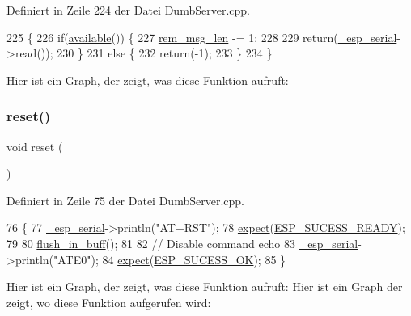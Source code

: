 Definiert in Zeile 224 der Datei Dumb\+Server.\+cpp.


\begin{DoxyCode}
225 \{
226   \textcolor{keywordflow}{if}(\hyperlink{classEspServer_a4549a76725f2e4c013e4d57018366109}{available}()) \{
227     \hyperlink{classEspServer_a34a62d83c82a13f441af983f9b212e25}{rem\_msg\_len} -= 1;
228 
229     \textcolor{keywordflow}{return}(\hyperlink{classEspServer_a552aab874ad99b696f4c997d6f5a4746}{\_esp\_serial}->read());
230   \}
231   \textcolor{keywordflow}{else} \{
232     \textcolor{keywordflow}{return}(-1);
233   \}
234 \}
\end{DoxyCode}
Hier ist ein Graph, der zeigt, was diese Funktion aufruft\+:
\mbox{\label{classEspServer_ad20897c5c8bd47f5d4005989bead0e55}} 
\subsubsection{\texorpdfstring{reset()}{reset()}}
{\footnotesize\ttfamily void reset (\begin{DoxyParamCaption}{ }\end{DoxyParamCaption})\hspace{0.3cm}{\ttfamily [private]}}



Definiert in Zeile 75 der Datei Dumb\+Server.\+cpp.


\begin{DoxyCode}
76 \{
77   \hyperlink{classEspServer_a552aab874ad99b696f4c997d6f5a4746}{\_esp\_serial}->println(\textcolor{stringliteral}{"AT+RST"});
78   \hyperlink{classEspServer_aff5ea67ab96af075223b2b836036ccf1}{expect}(\hyperlink{DumbServer_8cpp_af9850325c242ec48a5d70923c6147de5}{ESP\_SUCESS\_READY});
79 
80   \hyperlink{classEspServer_a1d791edc8eca304acc71f702f07c0437}{flush\_in\_buff}();
81 
82   \textcolor{comment}{// Disable command echo}
83   \hyperlink{classEspServer_a552aab874ad99b696f4c997d6f5a4746}{\_esp\_serial}->println(\textcolor{stringliteral}{"ATE0"});
84   \hyperlink{classEspServer_aff5ea67ab96af075223b2b836036ccf1}{expect}(\hyperlink{DumbServer_8cpp_a62497fcb12b1cedd5fdfbc0755508d87}{ESP\_SUCESS\_OK});
85 \}
\end{DoxyCode}
Hier ist ein Graph, der zeigt, was diese Funktion aufruft\+:
Hier ist ein Graph der zeigt, wo diese Funktion aufgerufen wird\+:
\mbox{\label{classEspServer_a7968cc44a6c9fff24b9020e1714c49f8}} 
